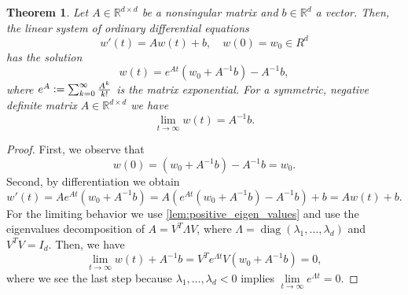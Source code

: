 \documentclass[12pt]{article}
\newtheorem{theorem}{Theorem}[section]
\theoremstyle{definition}
\numberwithin{equation}{section}
\newcommand{\R}{\mathbb{R}}
\newcommand{\defeq}{\vcentcolon=}
\DeclareMathOperator{\diag}{diag}
\begin{document}
\begin{theorem}
  \label{thm:ode_system}
  Let  $A \in \R^{d \times d}$ be a nonsingular matrix and $b \in \R^d$ a vector. Then, the linear system of ordinary differential equations
  \begin{equation*}
    w'(t) = Aw(t) + b, \quad w(0) = w_0 \in R^d
  \end{equation*}
  has the solution
  \begin{equation*}
    w(t) = e^{At}(w_0 + A^{-1}b) - A^{-1}b,
  \end{equation*}
  where $e^A \defeq \sum_{k=0}^\infty \frac{A^k}{k!}$ is the matrix exponential. For a symmetric, negative definite matrix $A \in \R^{d \times d}$ we have
  \begin{equation*}
    \lim_{t \rightarrow \infty} w(t) = A^{-1}b.
  \end{equation*}
\end{theorem}
\begin{proof}
  First, we observe that
  \begin{equation*}
    w(0) = (w_0 + A^{-1}b) - A^{-1}b = w_0.
  \end{equation*}
  Second, by differentiation we obtain
  \begin{equation*}
    w'(t) = A e^{At}(w_0+A^{-1}b) = A (e^{At}(w_0+A^{-1}b) - A^{-1}b) + b = Aw(t) + b.
  \end{equation*}
  For the limiting behavior we use \autoref{lem:positive_eigen_values} and use the eigenvalues decomposition of $A = V^T \Lambda V$, where $\Lambda=\diag(\lambda_1, \dots, \lambda_d)$ and $V^TV = I_d$. Then, we have
  \begin{equation*}
    \lim_{t \rightarrow \infty} w(t) + A^{-1}b = V^Te^{\Lambda t}V(w_0 + A^{-1}b) = 0,
  \end{equation*}
  where we see the last step because $\lambda_1,\dots,\lambda_d < 0$ implies $\lim\limits_{t \rightarrow \infty} e^{\Lambda t} = 0$.
\end{proof}
\end{document}
